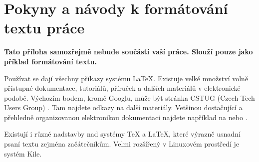 \documentclass[11pt,twoside,a4paper]{book}
\begin{document}




%




%

\appendix

\chapter{Pokyny a návody k formátování textu práce}
\textbf{\large Tato příloha samozřejmě nebude součástí vaší práce. Slouží pouze jako příklad formátování textu.}

Používat se dají všechny příkazy systému \LaTeX. Existuje velké množství volně přístupné dokumentace, tutoriálů, příruček a dalších materiálů v elektronické podobě. Výchozím bodem, kromě Googlu, může být stránka CSTUG (Czech Tech Users Group) \cite{CSTUG}. Tam najdete odkazy na další materiály.  Vetšinou dostačující a přehledně organizovanou elektronikou dokumentaci najdete například na \cite{latexdocweb} nebo \cite{latexwiki}.

Existují i různé nadstavby nad systémy \TeX{} a \LaTeX, které výrazně usnadní psaní textu zejména začátečníkům. Velmi rozšířený v Linuxovém prostředí je systém Kile.
\end{document}
